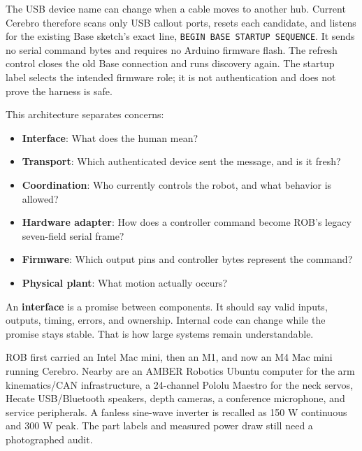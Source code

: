 \documentclass[11pt,openany]{book}
\begin{document}
The USB device name can change when a cable moves to another hub. Current Cerebro therefore scans only USB callout ports, resets each candidate, and listens for the existing Base sketch's exact line, \texttt{BEGIN BASE STARTUP SEQUENCE}. It sends no serial command bytes and requires no Arduino firmware flash. The refresh control closes the old Base connection and runs discovery again. The startup label selects the intended firmware role; it is not authentication and does not prove the harness is safe.

\ROBControlStackDiagram

This architecture separates concerns:

\begin{itemize}
  \item \textbf{Interface}: What does the human mean?
  \item \textbf{Transport}: Which authenticated device sent the message, and is it fresh?
  \item \textbf{Coordination}: Who currently controls the robot, and what behavior is allowed?
  \item \textbf{Hardware adapter}: How does a controller command become ROB's legacy seven-field serial frame?
  \item \textbf{Firmware}: Which output pins and controller bytes represent the command?
  \item \textbf{Physical plant}: What motion actually occurs?
\end{itemize}

\begin{conceptbox}
An \textbf{interface} is a promise between components. It should say valid inputs, outputs, timing, errors, and ownership. Internal code can change while the promise stays stable. That is how large systems remain understandable.
\end{conceptbox}


\begin{fieldnotebox}[title={THREE MAC MINI ERAS}]
ROB first carried an Intel Mac mini, then an M1, and now an M4 Mac mini running Cerebro. Nearby are an AMBER Robotics Ubuntu computer for the arm kinematics/CAN infrastructure, a 24-channel Pololu Maestro for the neck servos, Hecate USB/Bluetooth speakers, depth cameras, a conference microphone, and service peripherals. A fanless sine-wave inverter is recalled as 150 W continuous and 300 W peak. The part labels and measured power draw still need a photographed audit.
\end{fieldnotebox}
\end{document}
